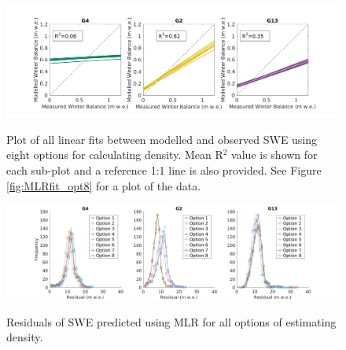 \documentclass[12pt]{article}
\begin{document}
\begin{landscape}
\begin{figure}
	\centering
	\includegraphics[height = 0.4\textwidth]{MLRfit_allLines.png}\\
	\caption{Plot of all linear fits between modelled and observed SWE using eight options for calculating density. Mean R$^2$ value is shown for each sub-plot and a reference 1:1 line is also provided. See Figure \ref{fig:MLRfit_opt8} for a plot of the data. }
	\label{fig:MLRfit_allLines}
\end{figure}

\begin{figure}
	\centering
	\includegraphics[height = 0.4\textwidth]{MLRresiduals_all.png}\\
	\caption{Residuals of SWE predicted using MLR for all options of estimating density.}
	\label{fig:MLRresiduals_all}
\end{figure}

\end{landscape}
 
\end{document}
